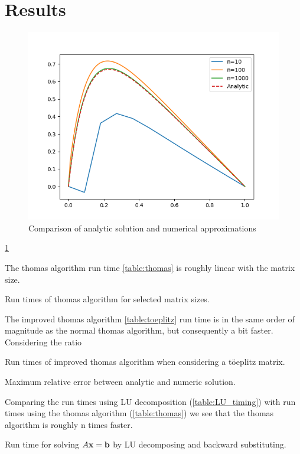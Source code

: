 \section*{Results}

\begin{figure}[H]
  \centering
  \includegraphics[width=\textwidth]{../figures/thomas.png}
  \caption{Comparison of analytic solution and numerical approximations}
  \label{fig:a}
\end{figure}

 \cref{fig:a}


The thomas algorithm run time \cref{table:thomas} is roughly linear with the
matrix size.

\begin{table}[h]
  \centering
  \caption{Run times of thomas algorithm for selected matrix sizes.}
  \label{table:thomas}
\end{table}

The improved thomas algorithm \cref{table:toeplitz} run time is in the same
order of magnitude as the normal thomas algorithm, but consequently a bit faster.
Considering the ratio


\begin{table}[h]
  \centering
  \caption{Run times of improved thomas algorithm when considering a töeplitz matrix.}
  \label{table:toeplitz}
\end{table}

\begin{table}[h]
  \centering
  \caption{Maximum relative error between analytic and numeric solution.}
  \label{table:relative_error}
\end{table}

Comparing the run times using LU decomposition
(\cref{table:LU_timing}) with run times using the thomas algorithm
(\cref{table:thomas}) we see that the thomas algorithm is roughly n times
faster.

\begin{table}[h]
  \centering
  \caption{Run time for solving $A\mathbf{x} = \mathbf{b}$ by LU decomposing and backward substituting.}
  \label{table:LU_timing}
\end{table}
